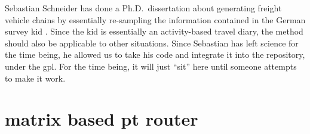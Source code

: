 

Sebastian Schneider has done a Ph.D.\ dissertation about generating freight vehicle chains by essentially re-sampling the information contained in the German survey \gls{kid} \citep{SteinmeyerWagner2005KiD}.  
Since the \gls{kid} is essentially an activity-based travel diary, the method should also be applicable to other situations.
Since Sebastian has left science for the time being, he allowed us to take his code and integrate it into the repository, under the \gls{gpl}. For the time being, it will just ``sit'' here until someone attempts to make it work.

%


\section{matrix based pt router}
\label{sec:matrix-based-pt-router}




